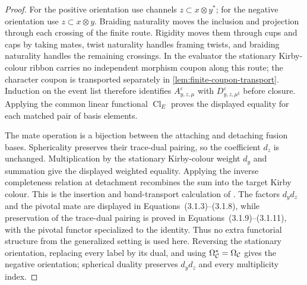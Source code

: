 \begin{proof}
For the positive orientation use channels $z\subset x\otimes y^*$; for the
negative orientation use $z\subset x\otimes y$.  Braiding naturality moves
the inclusion and projection through each crossing of the finite route.
Rigidity moves them through cups and caps by taking mates, twist naturality
handles framing twists, and braiding naturality handles the remaining
crossings.  In the evaluator the stationary Kirby-colour ribbon carries no
independent morphism coupon along this route; the character coupon is
transported separately in \cref{lem:finite-coupon-transport}.  Induction on
the event list therefore identifies
$A^\varepsilon_{y,z,\mu}$ with
$D^\varepsilon_{y,z,\mu^\sharp}$ before closure.  Applying the common linear
functional $\operatorname{Cl}_E$ proves the displayed equality for each
matched pair of basis elements.

The mate operation is a bijection between the attaching and detaching fusion
bases.  Sphericality preserves their trace-dual pairing, so the coefficient
$d_z$ is unchanged.  Multiplication by the stationary Kirby-colour weight
$d_y$ and summation give the displayed weighted equality.  Applying the
inverse completeness relation at detachment recombines the sum into the
target Kirby colour.  This is the insertion and band-transport calculation of
\cite[Lemmas~3.2--3.4]{BarenzBarrett2018}.  The factors $d_y d_z$ and the
pivotal mate are displayed in Equations~(3.1.3)--(3.1.8), while preservation
of the trace-dual pairing is proved in Equations~(3.1.9)--(3.1.11), with the
pivotal functor specialized to the identity.  Thus no extra functorial
structure from the generalized setting is used here.  Reversing the
stationary orientation, replacing every label by its dual, and using
$\Omega_{\mathcal{C}}^*=\Omega_{\mathcal{C}}$ gives the negative orientation; spherical
duality preserves $d_y d_z$ and every multiplicity index.
\end{proof}

